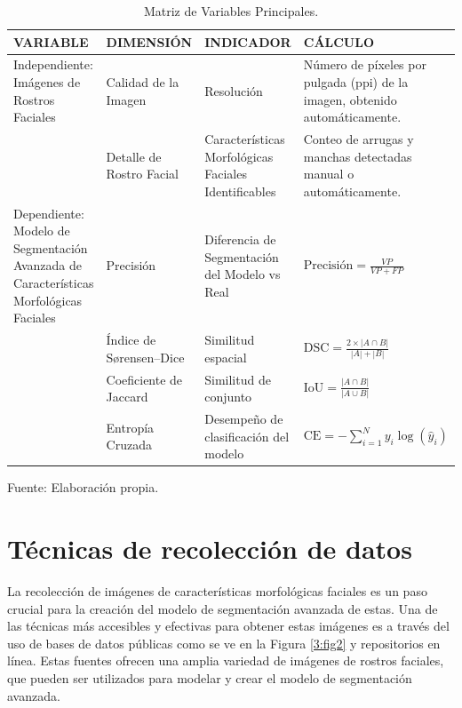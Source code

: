 \begin{longtable}{>{\centering\arraybackslash}m{3cm} >{\centering\arraybackslash}m{2.5cm} >{\centering\arraybackslash}m{2.5cm} >{\raggedright\arraybackslash}m{7cm}}
    \caption{Matriz de Variables Principales.}
    \label{tabla:variables}\\
    \hline
    VARIABLE & DIMENSIÓN & INDICADOR & CÁLCULO \\
    \hline
    Independiente: Imágenes de Rostros Faciales & Calidad de la Imagen & Resolución & Número de píxeles por pulgada (ppi) de la imagen, obtenido automáticamente. \\
    \cline{2-4}
     & Detalle de Rostro Facial & Características Morfológicas Faciales Identificables & Conteo de arrugas y manchas detectadas manual o automáticamente. \\
    \hline
    Dependiente: Modelo de Segmentación Avanzada de Características Morfológicas Faciales & Precisión & Diferencia de Segmentación del Modelo vs Real & $\text{Precisión} = \frac{VP}{VP + FP}$ \\ 
    \cline{2-4}
     & Índice de Sørensen–Dice & Similitud espacial & $\text{DSC} = \frac{2 \times |A \cap B|}{|A| + |B|}$ \\
    \cline{2-4}
     & Coeficiente de Jaccard & Similitud de conjunto & $\text{IoU} = \frac{|A \cap B|}{|A \cup B|}$ \\
    \cline{2-4}
     & Entropía Cruzada & Desempeño de clasificación del modelo & $\text{CE} = -\sum_{i=1}^{N} y_i \log(\hat{y}_i)$ \\
    \hline
\end{longtable}



\begin{flushleft}
	\small Fuente: Elaboración propia.
\end{flushleft}


   

\section{Técnicas de recolección de datos}
La recolección de imágenes de características morfológicas faciales es un paso crucial para la creación del modelo de segmentación avanzada de estas. Una de las técnicas más accesibles y efectivas para obtener estas imágenes es a través del uso de bases de datos públicas como se ve en la Figura \ref{3:fig2} y repositorios en línea. Estas fuentes ofrecen una amplia variedad de imágenes de rostros faciales, que pueden ser utilizados para modelar y crear el modelo de segmentación avanzada.

